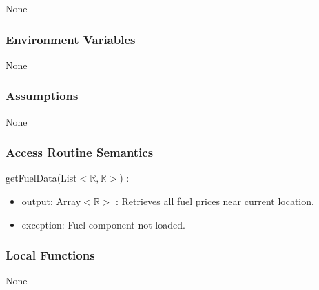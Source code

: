 \documentclass[12pt, titlepage]{article}
\begin{document}
None

\subsubsection{Environment Variables}

None

\subsubsection{Assumptions}

None

\subsubsection{Access Routine Semantics}

\noindent getFuelData(List$<\mathbb{R},\mathbb{R}>$) :
\begin{itemize}
\item output: Array$<\mathbb{R}>$ : Retrieves all fuel prices near current location.
\item exception: Fuel component not loaded.
\end{itemize}

\subsubsection{Local Functions}

None

\newpage

\end{document}
